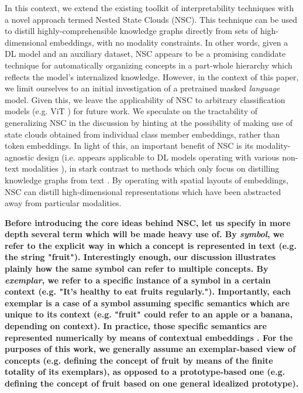 In this context, we extend the existing toolkit of interpretability techniques with a novel approach termed Nested State Clouds (NSC). This technique can be used to distill highly-comprehensible knowledge graphs directly from sets of high-dimensional embeddings, with no modality constraints. In other words, given a DL model and an auxiliary dataset, NSC appears to be a promising candidate technique for automatically organizing concepts in a part-whole hierarchy which reflects the model's internalized knowledge. However, in the context of this paper, we limit ourselves to an initial investigation of a pretrained masked \textit{language} model. Given this, we leave the applicability of NSC to arbitrary classification models (e.g. ViT \citep{dosovitskiy_image_2021}) for future work. We speculate on the tractability of generalizing NSC in the discussion by hinting at the possibility of making use of state clouds obtained from individual class member embeddings, rather than token embeddings. In light of this, an important benefit of NSC is its modality-agnostic design (i.e. appears applicable to DL models operating with various non-text modalities \citep{noauthor_multimodal_nodate}), in stark contrast to methods which only focus on distilling knowledge graphs from text \citep{wang_language_2020}. By operating with spatial layouts of embeddings, NSC can distill high-dimensional representations which have been abstracted away from particular modalities.

\textbf{Before introducing the core ideas behind NSC, let us specify in more depth several term which will be made heavy use of. By \textit{symbol}, we refer to the explicit way in which a concept is represented in text (e.g. the string "fruit"). Interestingly enough, our discussion illustrates plainly how the same symbol can refer to multiple concepts. By \textit{exemplar}, we refer to a specific instance of a symbol in a certain context (e.g. "It's healthy to eat \textbf{fruit}s regularly."). Importantly, each exemplar is a case of a symbol assuming specific semantics which are unique to its context (e.g. "fruit" could refer to an apple or a banana, depending on context). In practice, those specific semantics are represented numerically by means of contextual embeddings \citep{devlin_bert_nodate}. For the purposes of this work, we generally assume an exemplar-based view of concepts (e.g. defining the concept of fruit by means of the finite totality of its exemplars), as opposed to a prototype-based one (e.g. defining the concept of fruit based on one general idealized prototype).}

